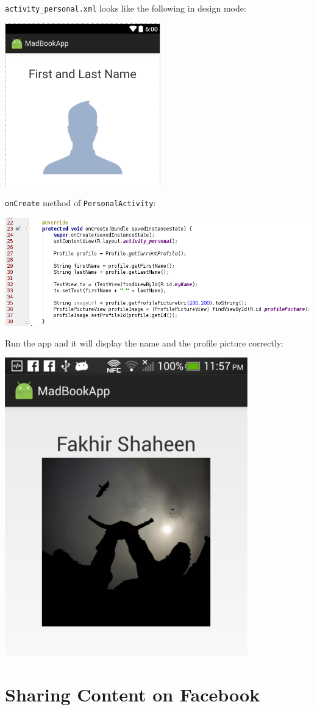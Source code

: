 \texttt{activity\_personal.xml} looks like the following in design mode:

\begin{center}
	\includegraphics[scale=\FigureScale]{chapters/ch12/images/32}
\end{center}

\texttt{onCreate} method of \texttt{PersonalActivity}:

\begin{center}
	\includegraphics[scale=\SourceCodeScale]{chapters/ch12/images/33}
\end{center}


Run the app and it will display the name and the profile picture correctly:

\begin{center}
	\includegraphics[scale=\FigureScale]{chapters/ch12/images/34}
\end{center}

\section{Sharing Content on Facebook}